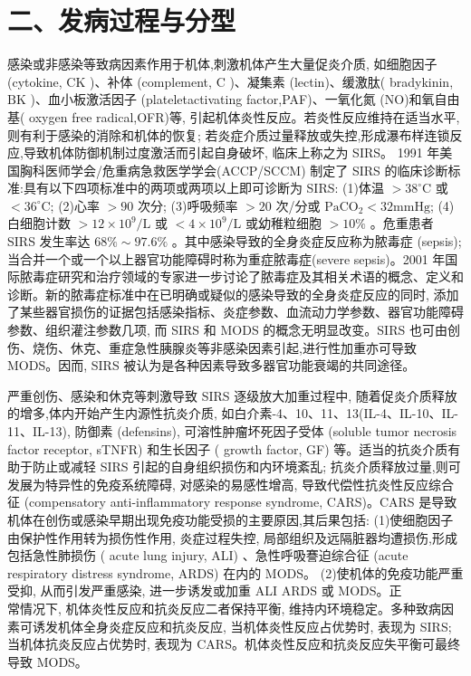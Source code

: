 \documentclass[10pt]{article}
\begin{document}
\section*{二、发病过程与分型}
感染或非感染等致病因素作用于机体,刺激机体产生大量促炎介质, 如细胞因子 (cytokine, $\mathrm{CK}$ )、补体 (complement, $\mathrm{C}$ )、凝集素 (lectin)、缓激肽( bradykinin, $\mathrm{BK}$ )、血小板激活因子 (plateletactivating factor,PAF)、一氧化氮 (NO)和氧自由基( oxygen free radical,OFR)等, 引起机体炎性反应。若炎性反应维持在适当水平, 则有利于感染的消除和机体的恢复; 若炎症介质过量释放或失控,形成瀑布样连锁反应,导致机体防御机制过度激活而引起自身破坏, 临床上称之为 SIRS。 1991 年美国胸科医师学会/危重病急救医学学会(ACCP/SCCM) 制定了 SIRS 的临床诊断标准:具有以下四项标准中的两项或两项以上即可诊断为 SIRS: (1)体温 $>38^{\circ} \mathrm{C}$ 或 $<36^{\circ} \mathrm{C}$; (2)心率 $>90$ 次分; (3)呼吸频率 $>20$ 次/分或 $\mathrm{PaCO}_{2}<32 \mathrm{mmHg}$; (4)白细胞计数 $>12 \times 10^{9} / \mathrm{L}$ 或 $<4 \times 10^{9} / \mathrm{L}$ 或幼稚粒细胞 $>10 \%$ 。危重患者 SIRS 发生率达 $68 \% \sim 97.6 \%$ 。其中感染导致的全身炎症反应称为脓毒症 (sepsis); 当合并一个或一个以上器官功能障碍时称为重症脓毒症(severe sepsis)。2001 年国际脓毒症研究和治疗领域的专家进一步讨论了脓毒症及其相关术语的概念、定义和诊断。新的脓毒症标准中在已明确或疑似的感染导致的全身炎症反应的同时, 添加了某些器官损伤的证据包括感染指标、炎症参数、血流动力学参数、器官功能障碍参数、组织灌注参数几项, 而 SIRS 和 MODS 的概念无明显改变。SIRS 也可由创伤、烧伤、休克、重症急性胰腺炎等非感染因素引起,进行性加重亦可导致 MODS。因而, SIRS 被认为是各种因素导致多器官功能衰竭的共同途径。

严重创伤、感染和休克等刺激导致 SIRS 逐级放大加重过程中, 随着促炎介质释放的增多,体内开始产生内源性抗炎介质, 如白介素-4、10、11、13(IL-4、IL-10、IL-11、IL-13), 防御素 (defensins), 可溶性肿瘤坏死因子受体 (soluble tumor necrosis factor receptor, sTNFR) 和生长因子 ( growth factor, GF) 等。适当的抗炎介质有助于防止或减轻 SIRS 引起的自身组织损伤和内环境紊乱; 抗炎介质释放过量,则可发展为特异性的免疫系统障碍, 对感染的易感性增高, 导致代偿性抗炎性反应综合征 (compensatory anti-inflammatory response syndrome, CARS)。CARS 是导致机体在创伤或感染早期出现免疫功能受损的主要原因,其后果包括: (1)使细胞因子由保护性作用转为损伤性作用, 炎症过程失控, 局部组织及远隔脏器均遭损伤,形成包括急性肺损伤 ( acute lung injury, ALI) 、急性呼吸謇迫综合征 (acute respiratory distress syndrome, ARDS) 在内的 MODS。 (2)使机体的免疫功能严重受抑, 从而引发严重感染, 进一步诱发或加重 ALI ARDS 或 MODS。正\\
常情况下, 机体炎性反应和抗炎反应二者保持平衡, 维持内环境稳定。多种致病因素可诱发机体全身炎症反应和抗炎反应, 当机体炎性反应占优势时, 表现为 SIRS; 当机体抗炎反应占优势时, 表现为 CARS。机体炎性反应和抗炎反应失平衡可最终导致 MODS。
\end{document}
